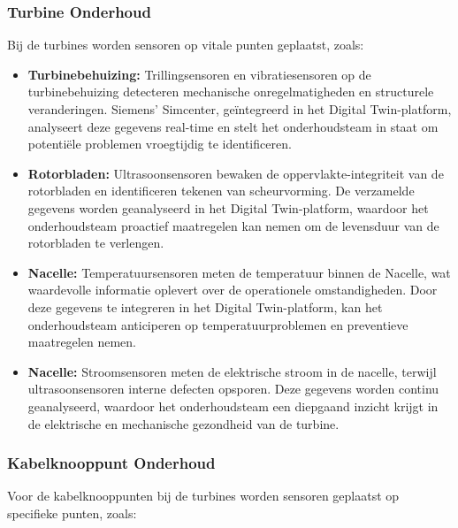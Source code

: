 \subsubsection{Turbine Onderhoud}

Bij de turbines worden sensoren op vitale punten geplaatst, zoals:

\begin{itemize}
    \item \textbf{Turbinebehuizing:} Trillingsensoren en vibratiesensoren op de turbinebehuizing detecteren mechanische onregelmatigheden en structurele veranderingen. Siemens' Simcenter, geïntegreerd in het Digital Twin-platform, analyseert deze gegevens real-time en stelt het onderhoudsteam in staat om potentiële problemen vroegtijdig te identificeren\cite{5608150}.
    
    \item \textbf{Rotorbladen:} Ultrasoonsensoren bewaken de oppervlakte-integriteit van de rotorbladen en identificeren tekenen van scheurvorming. De verzamelde gegevens worden geanalyseerd in het Digital Twin-platform, waardoor het onderhoudsteam proactief maatregelen kan nemen om de levensduur van de rotorbladen te verlengen\cite{5608150}.
    
    \item \textbf{Nacelle:} Temperatuursensoren meten de temperatuur binnen de Nacelle, wat waardevolle informatie oplevert over de operationele omstandigheden. Door deze gegevens te integreren in het Digital Twin-platform, kan het onderhoudsteam anticiperen op temperatuurproblemen en preventieve maatregelen nemen\cite{5608150}.
    
    \item \textbf{Nacelle:} Stroomsensoren meten de elektrische stroom in de nacelle, terwijl ultrasoonsensoren interne defecten opsporen. Deze gegevens worden continu geanalyseerd, waardoor het onderhoudsteam een diepgaand inzicht krijgt in de elektrische en mechanische gezondheid van de turbine\cite{5608150}.
\end{itemize}

\subsubsection{Kabelknooppunt Onderhoud}

Voor de kabelknooppunten bij de turbines worden sensoren geplaatst op specifieke punten, zoals:


